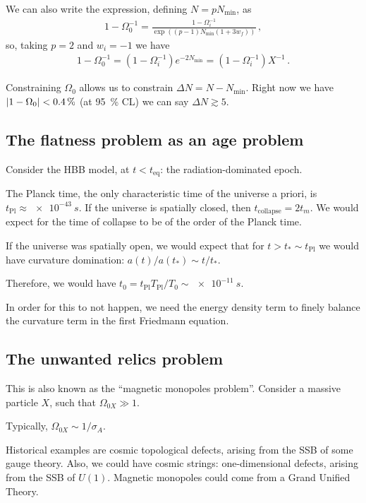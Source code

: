 \documentclass[main.tex]{subfiles}
\begin{document}
We can also write the expression, defining \(N = p N _{\text{min}}\), as
%
\begin{align}
1 - \Omega_0^{-1} = \frac{1 - \Omega_i^{-1}}{\exp((p -1) N _{\text{min}} (1 + 3 w_f))}
\,,
\end{align}
%
so, taking \(p = 2\) and \(w_i = -1\) we have 
%
\begin{align}
1 - \Omega_0^{-1} = (1 - \Omega _i^{-1} ) e^{-2 N _{\text{min}}} = (1-\Omega _i^{-1}) X^{-1}
\,.
\end{align}

Constraining \(\Omega_0\) allows us to constrain \(\Delta N = N - N _{\text{min}}\). 
Right now we have \(\abs{1 - \Omega_0 } < \SI{.4}{\percent}\) (at \SI{95}{\percent} CL) we can say \(\Delta N \gtrsim 5\).

\subsection{The flatness problem as an age problem}

Consider the HBB model, at \(t < t _{\text{eq}}\): the radiation-dominated epoch. 

The Planck time, the only characteristic time of the universe a priori, is \(t _{\text{Pl}} \approx \SI{e-43}{s}\). 
If the universe is spatially closed, then \(t _{\text{collapse}} = 2 t_m\). 
We would expect for the time of collapse to be of the order of the Planck time. 

If the universe was spatially open, we would expect that for \(t > t_* \sim t _{\text{Pl}}\) we would have curvature domination: \(a (t)/ a(t _*) \sim t / t_* \).

Therefore, we would have \(t_0 = t _{\text{Pl}} T _{\text{Pl}} / T_0 \sim \SI{e-11}{s}\). 

In order for this to not happen, we need the energy density term to finely balance the curvature term in the first Friedmann equation.

\subsection{The unwanted relics problem}

This is also known as the ``magnetic monopoles problem''.
Consider a massive particle \(X\), such that \(\Omega_{0X} \gg 1\). 

Typically, \(\Omega_{0X} \sim 1 / \sigma _A\). 

Historical examples are cosmic topological defects, arising from the SSB of some gauge theory. 
Also, we could have cosmic strings: one-dimensional defects, arising from the SSB of \(U(1)\).
Magnetic monopoles could come from a Grand Unified Theory.
\end{document}
